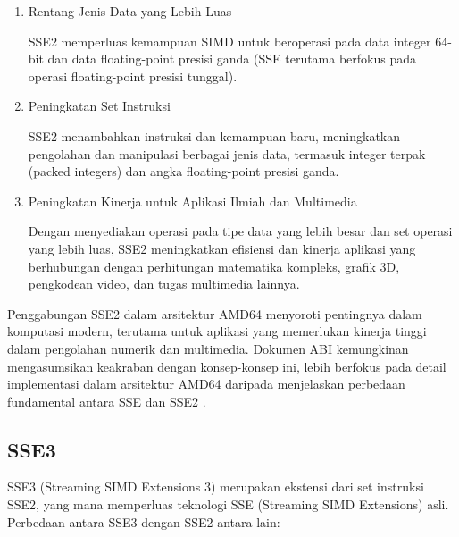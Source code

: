 \begin{enumerate}
	\item Rentang Jenis Data yang Lebih Luas

	      SSE2 memperluas kemampuan SIMD untuk beroperasi pada data integer 64-bit dan data floating-point presisi ganda (SSE terutama berfokus pada operasi floating-point presisi tunggal).

	\item Peningkatan Set Instruksi

	      SSE2 menambahkan instruksi dan kemampuan baru, meningkatkan pengolahan dan manipulasi berbagai jenis data, termasuk integer terpak (packed integers) dan angka floating-point presisi ganda.

	\item Peningkatan Kinerja untuk Aplikasi Ilmiah dan Multimedia

	      Dengan menyediakan operasi pada tipe data yang lebih besar dan set operasi yang lebih luas, SSE2 meningkatkan efisiensi dan kinerja aplikasi yang berhubungan dengan perhitungan matematika kompleks, grafik 3D, pengkodean video, dan tugas multimedia lainnya.
\end{enumerate}

Penggabungan SSE2 dalam arsitektur AMD64 menyoroti pentingnya dalam komputasi modern, terutama untuk aplikasi yang memerlukan kinerja tinggi dalam pengolahan numerik dan multimedia. Dokumen ABI kemungkinan mengasumsikan keakraban dengan konsep-konsep ini, lebih berfokus pada detail implementasi dalam arsitektur AMD64 daripada menjelaskan perbedaan fundamental antara SSE dan SSE2 \cite{SystemVAppBinaryInterfaceMichael}.

\subsection{SSE3}
SSE3 (Streaming SIMD Extensions 3) merupakan ekstensi dari set instruksi SSE2, yang mana memperluas teknologi SSE (Streaming SIMD Extensions) asli. Perbedaan antara SSE3 dengan SSE2 antara lain:

